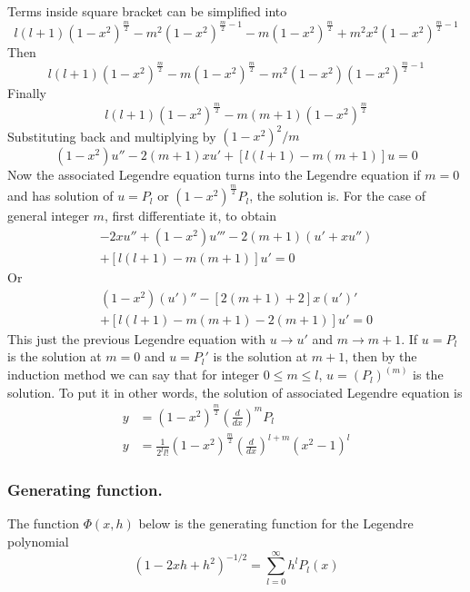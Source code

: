\documentclass[../../../main.tex]{subfiles}
\begin{document}
Terms inside square bracket can be simplified into
\begin{equation*}
    l(l+1)(1-x^2)^{\frac{m}{2}}-m^2(1-x^2)^{\frac{m}{2}-1} -m(1-x^2)^{\frac{m}{2}} +m^2x^2(1-x^2)^{\frac{m}{2}-1}
\end{equation*}
Then
\begin{equation*}
    l(l+1)(1-x^2)^{\frac{m}{2}}-m(1-x^2)^{\frac{m}{2}} -m^2(1-x^2)(1-x^2)^{\frac{m}{2}-1}
\end{equation*}
Finally
\begin{equation*}
    l(l+1)(1-x^2)^{\frac{m}{2}} -m(m+1)(1-x^2)^{\frac{m}{2}}
\end{equation*}
Substituting back and multiplying by $(1-x^2)^2/m$
\begin{equation*}
    (1-x^2)u''-2(m+1)xu'+\left[l(l+1)-m(m+1)\right]u=0
\end{equation*}
Now the associated Legendre equation turns into the Legendre equation if $m=0$ and has solution of $u=P_l$ or $(1-x^2)^{\frac{m}{2}}P_l$,  the solution is.
For the case of general integer $m$, first differentiate it, to obtain
\begin{gather*}
    -2xu'' +(1-x^2)u'''-2(m+1)(u'+xu'')\\
    +\left[l(l+1)-m(m+1)\right]u'=0
\end{gather*}
Or
\begin{gather*}
    (1-x^2)(u')''-[2(m+1)+2]x(u')'\\
    +\left[l(l+1)-m(m+1)-2(m+1)\right]u'=0
\end{gather*}
This just the previous Legendre equation with $u\rightarrow u'$ and $m\rightarrow m+1$.
If $u=P_l$ is the solution at $m=0$ and $u=P_l'$ is the solution at $m+1$, then by the induction method we can say that for integer $0\leq m\leq l$, $u=(P_l)^{(m)}$ is the solution.
To put it in other words, the solution of associated Legendre equation is
\begin{align*}
    y & =(1-x^2)^{\frac{m}{2}}\left(\frac{d}{dx}\right)^m P_l                         \\
    y & =\frac{1}{2^ll!}(1-x^2)^{\frac{m}{2}}\left(\frac{d}{dx}\right)^{l+m}(x^2-1)^l
\end{align*}


\subsubsection{Generating function.} The function $\Phi(x,h)$ below is the generating function for the Legendre polynomial
\begin{equation*}
    (1-2xh+h^2)^{-1/2}=\sum_{l=0}^{\infty}h^lP_l(x)
\end{equation*}
\end{document}
